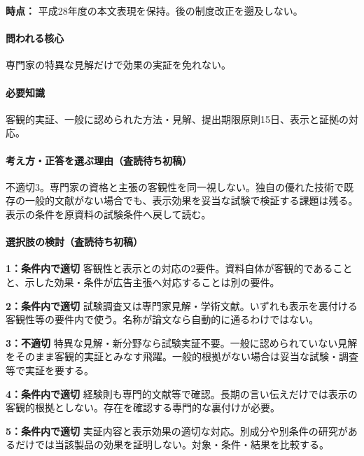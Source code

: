 \noindent\textbf{時点：} 平成28年度の本文表現を保持。後の制度改正を遡及しない。\par

\paragraph{問われる核心} 専門家の特異な見解だけで効果の実証を免れない。

\paragraph{必要知識} 客観的実証、一般に認められた方法・見解、提出期限原則15日、表示と証拠の対応。

\paragraph{考え方・正答を選ぶ理由（査読待ち初稿）} 不適切3。専門家の資格と主張の客観性を同一視しない。独自の優れた技術で既存の一般的文献がない場合でも、表示効果を妥当な試験で検証する課題は残る。表示の条件を原資料の試験条件へ戻して読む。

\paragraph{選択肢の検討（査読待ち初稿）}\mbox{}\par

\noindent\textbf{1：条件内で適切} 客観性と表示との対応の2要件。資料自体が客観的であることと、示した効果・条件が広告主張へ対応することは別の要件。\par

\noindent\textbf{2：条件内で適切} 試験調査又は専門家見解・学術文献。いずれも表示を裏付ける客観性等の要件内で使う。名称が論文なら自動的に通るわけではない。\par

\noindent\textbf{3：不適切} 特異な見解・新分野なら試験実証不要。一般に認められていない見解をそのまま客観的実証とみなす飛躍。一般的根拠がない場合は妥当な試験・調査等で実証を要する。\par

\noindent\textbf{4：条件内で適切} 経験則も専門的文献等で確認。長期の言い伝えだけでは表示の客観的根拠としない。存在を確認する専門的な裏付けが必要。\par

\noindent\textbf{5：条件内で適切} 実証内容と表示効果の適切な対応。別成分や別条件の研究があるだけでは当該製品の効果を証明しない。対象・条件・結果を比較する。\par

